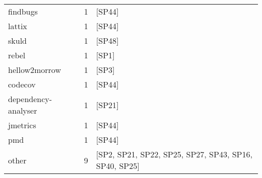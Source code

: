 \begin{tabular}{lrl}
            findbugs &      1 &                                                 [SP44] \\
              lattix &      1 &                                                 [SP44] \\
               skuld &      1 &                                                 [SP48] \\
               rebel &      1 &                                                  [SP1] \\
       hellow2morrow &      1 &                                                  [SP3] \\
             codecov &      1 &                                                 [SP44] \\
 dependency-analyser &      1 &                                                 [SP21] \\
            jmetrics &      1 &                                                 [SP44] \\
                 pmd &      1 &                                                 [SP44] \\
               other &      9 &  [SP2, SP21, SP22, SP25, SP27, SP43, SP16, SP40, SP25] \\
\bottomrule
\end{tabular}
